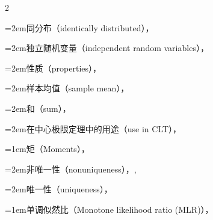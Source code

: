 \begin{multicols}{2}
\par\noindent\hangindent=2em\hspace*{1em}\label{idx:691}同分布（identically distributed），\hyperref[thm:2.3.11]{\pageref*{thm:2.3.11}}\par
\par\noindent\hangindent=2em\hspace*{1em}\label{idx:692}独立随机变量（independent random variables），\hyperref[thm:4.2.12]{\pageref*{thm:4.2.12}}\par
\par\noindent\hangindent=2em\hspace*{1em}\label{idx:693}性质（properties），\hyperref[thm:2.3.15]{\pageref*{thm:2.3.15}}\par
\par\noindent\hangindent=2em\hspace*{1em}\label{idx:694}样本均值（sample mean），\hyperref[thm:5.2.7]{\pageref*{thm:5.2.7}}\par
\par\noindent\hangindent=2em\hspace*{1em}\label{idx:695}和（sum），\hyperref[thm:4.6.7]{\pageref*{thm:4.6.7}}\par
\par\noindent\hangindent=2em\hspace*{1em}\label{idx:696}在中心极限定理中的用途（use in CLT），\hyperref[idxocc:696:224]{\pageref*{idxocc:696:224}}\par
\par\addvspace{2pt}
\par\noindent\hangindent=1em\hspace*{0em}\label{idx:697}矩（Moments），\hyperref[def:2.3.1]{\pageref*{def:2.3.1}}\par
\par\noindent\hangindent=2em\hspace*{1em}\label{idx:698}非唯一性（nonuniqueness），\hyperref[ex:2.3.10]{\pageref*{ex:2.3.10}}, \hyperref[exercise:2.35]{\pageref*{exercise:2.35}}\par
\par\noindent\hangindent=2em\hspace*{1em}\label{idx:699}唯一性（uniqueness），\hyperref[sec:2.6.1]{\pageref*{sec:2.6.1}}\par
\par\addvspace{2pt}
\par\noindent\hangindent=1em\hspace*{0em}\label{idx:700}单调似然比（Monotone likelihood ratio (MLR)），\hyperref[def:8.3.16]{\pageref*{def:8.3.16}}\par

\end{multicols}
